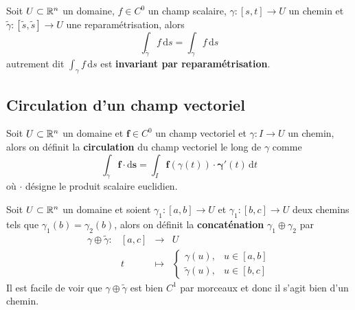  
 \begin{theoreme} \label{thm: Invariance par reparamétrisation}
 	Soit $U \subset \mathbb{R}^n$ un domaine, $f \in C^0$ un champ scalaire, $\gamma : [s,t] \to U$ un chemin et $\tilde \gamma : [\tilde s, \tilde s] \to U$ une reparamétrisation, alors
 	\[
 	\int_{\tilde \gamma} f \, \mathrm ds = \int_\gamma f \, \mathrm ds
 	\]
 	autrement dit $\int_\gamma f \, \mathrm ds$ est \textbf{invariant par reparamétrisation}.
\end{theoreme}

\subsection{Circulation d'un champ vectoriel}

\begin{definition}[Circulation] \label{def: Circulation}
	Soit $U \subset \mathbb{R}^n$ un domaine et $\bm f \in C^0$ un champ vectoriel et $\gamma : I \to U$ un chemin, alors on définit la \textbf{circulation} du champ vectoriel le long de $\gamma$ comme
	\[
	\int_{\gamma} \bm f \cdot \mathrm d \bm s = \int_I \bm f(\gamma(t)) \cdot \bm \gamma'(t) \, \mathrm dt
	\]
	où $\cdot$ désigne le produit scalaire euclidien.
\end{definition}

\begin{definition} \label{def: Concaténation de chemin}
	Soit $U \subset \mathbb{R}^n$ un domaine et soient $\gamma_1 : [a,b] \to U$ et $\gamma_1 : [b, c] \to U$ deux chemins tels que $\gamma_1(b) = \gamma_2(b)$, alors on définit la \textbf{concaténation} $\gamma_1 \oplus \gamma_2$ par 
	\[
	\begin{array}{cccc}
		\gamma \oplus \tilde \gamma : & [a,c] & \longrightarrow & U \\
										& t & \longmapsto & 
										\begin{cases}
											\gamma(u), & u \in [a,b] \\
											\tilde\gamma(u), & u \in [b,c]
										\end{cases}
	\end{array}
	\]
	Il est facile de voir que $\gamma \oplus \tilde \gamma$ est bien $C^1$ par morceaux et donc il s'agit bien d'un chemin.
\end{definition}

